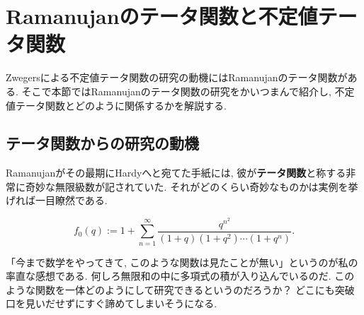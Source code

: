\documentclass[11pt,b5paper,oneside,lualatex]{ltjsarticle} %
\numberwithin{equation}{section} %
\begin{document}
\section{Ramanujanのテータ関数と不定値テータ関数} \label{sec:mock}


Zwegersによる不定値テータ関数の研究の動機にはRamanujanのテータ関数がある. 
そこで本節ではRamanujanのテータ関数の研究をかいつまんで紹介し, 不定値テータ関数とどのように関係するかを解説する. 


\subsection{テータ関数からの研究の動機} \label{subsec:mock}


Ramanujanがその最期にHardyへと宛てた手紙には, 彼が\textbf{テータ関数}と称する非常に奇妙な無限級数が記されていた. 
それがどのくらい奇妙なものかは実例を挙げれば一目瞭然である. 

\begin{dfn}
	\[
	f_0(q) :=
	1 + \sum_{n=1}^{\infty} \frac{q^{n^2}}{(1+q)(1+q^2) \cdots (1+q^n)}.
	\]
\end{dfn}

%

「今まで数学をやってきて, このような関数は見たことが無い」というのが私の率直な感想である. 
何しろ無限和の中に多項式の積が入り込んでいるのだ. 
このような関数を一体どのようにして研究できるというのだろうか？
どこにも突破口を見いだせずにすぐ諦めてしまいそうになる.
\end{document}
